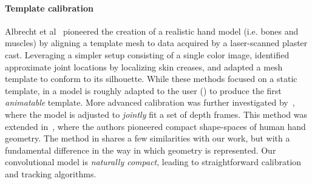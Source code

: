 
\paragraph{Template calibration}
Albrecht et al~ pioneered the creation of a realistic hand model (i.e. bones and muscles) by aligning a template mesh to data acquired by a laser-scanned plaster cast. Leveraging a simpler setup consisting of a single color image, \cite{rhee2006hand} identified approximate joint locations by localizing skin creases, and adapted a mesh template to conform to its silhouette. While these methods focused on a static template, in \cite{delagorce2011model} a model is roughly adapted to the user () to produce the first \emph{animatable} template. More advanced calibration was further investigated by~\cite{taylor2014user}, where the model is adjusted to \emph{jointly} fit a set of depth frames. This method was extended in~\cite{khamis15learning}, where the authors pioneered compact   shape-spaces of human hand geometry.
% 
The method in \cite{taylor2014user} shares a few similarities with our work, but with a fundamental difference in the way in which geometry is represented. Our convolutional model is \emph{naturally compact}, leading to straightforward calibration and tracking algorithms. 

